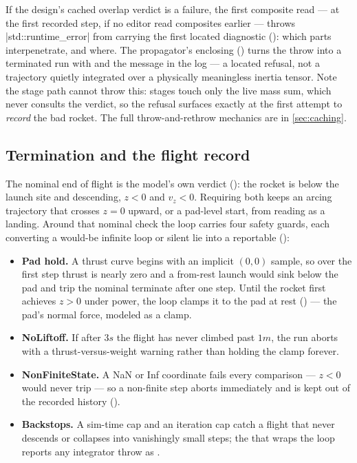 \begin{hardfail}
If the design's cached overlap verdict is a failure, the first composite read ---
 at the first recorded step, if no editor read composites earlier ---
throws \cppinline|std::runtime_error| from  carrying the first located
diagnostic (): which parts interpenetrate, and where. The
propagator's enclosing  () turns the throw into a
terminated run with  and the message in the log --- a
located refusal, not a trajectory quietly integrated over a physically meaningless inertia
tensor. Note the stage path cannot throw this: stages touch only the live mass sum, which never
consults the verdict, so the refusal surfaces exactly at the first attempt to \emph{record} the
bad rocket. The full throw-and-rethrow mechanics are in \cref{sec:caching}.
\end{hardfail}

\subsection{Termination and the flight record}\label{sec:flight-end}

The nominal end of flight is the model's own verdict (): the
rocket is below the launch site and descending, $z < 0$ and $v_z < 0$. Requiring both keeps an
arcing trajectory that crosses $z = 0$ upward, or a pad-level start, from reading as a landing.
Around that nominal check the loop carries four safety guards, each converting a would-be
infinite loop or silent lie into a reportable 
():

\begin{itemize}
\item \textbf{Pad hold.} A thrust curve begins with an implicit $(0,0)$ sample, so over the first
      step thrust is nearly zero and a from-rest launch would sink below the pad and trip the
      nominal terminate after one step. Until the rocket first achieves $z > 0$ under power, the
      loop clamps it to the pad at rest () --- the pad's normal
      force, modeled as a clamp.
\item \textbf{NoLiftoff.} If after $3\unit{s}$ the flight has never climbed past $1\unit{m}$, the
      run aborts with a thrust-versus-weight warning rather than holding the clamp forever.
\item \textbf{NonFiniteState.} A NaN or Inf coordinate fails every comparison --- $z < 0$ would
      never trip --- so a non-finite step aborts immediately and is kept out of the recorded
      history ().
\item \textbf{Backstops.} A sim-time cap and an iteration cap catch a flight that never descends
      or collapses into vanishingly small steps; the  that wraps the loop reports any
      integrator throw as .
\end{itemize}

